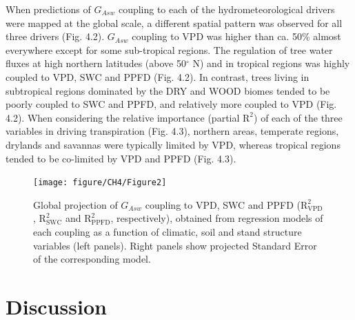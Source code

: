 \documentclass[11pt,twoside]{reedthesis}
\begin{document}
When predictions of \(G_{Asw}\) coupling to each of the
hydrometeorological drivers were mapped at the global scale, a different
spatial pattern was observed for all three drivers (Fig. 4.2).
\(G_{Asw}\) coupling to VPD was higher than ca. 50\% almost everywhere
except for some sub-tropical regions. The regulation of tree water
fluxes at high northern latitudes (above 50\(^{\circ}\) N) and in
tropical regions was highly coupled to VPD, SWC and PPFD (Fig. 4.2). In
contrast, trees living in subtropical regions dominated by the DRY and
WOOD biomes tended to be poorly coupled to SWC and PPFD, and relatively
more coupled to VPD (Fig. 4.2). When considering the relative importance
(partial \(\text{R}^2\)) of each of the three variables in driving
transpiration (Fig. 4.3), northern areas, temperate regions, drylands
and savannas were typically limited by VPD, whereas tropical regions
tended to be co-limited by VPD and PPFD (Fig. 4.3).\par
\begin{figure}[hbt!]

{\centering \texttt{[image: figure/CH4/Figure2]} 

}

\caption[Global projection of $G_{\text{Asw}}$ coupling to VPD, SWC and PPFD.]{Global projection of $G_{Asw}$ coupling to VPD, SWC and PPFD ($\text{R}^2_{\text{VPD}}$, $\text{R}^2_{\text{SWC}}$ and $\text{R}^2_{\text{PPFD}}$, respectively), obtained from regression models of each coupling as a function of climatic, soil and stand structure variables (left panels). Right panels show projected Standard Error of the corresponding model.}\label{fig:ch4fig2}
\end{figure}
\section{Discussion}\label{discussion}
\end{document}
